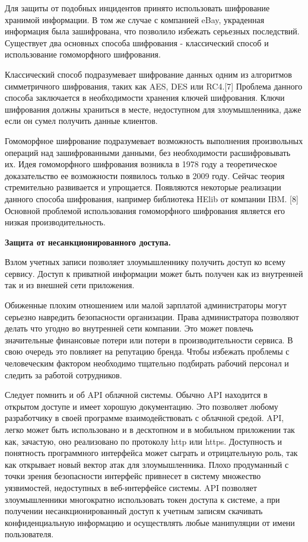 Для защиты от подобных инцидентов принято использовать шифрование хранимой информации. В том же случае с компанией eBay, украденная информация была зашифрована, что позволило избежать серьезных последствий. Существует два основных способа шифрования - классический способ и использование гомоморфного шифрования. 

Классический способ подразумевает шифрование данных одним из алгоритмов симметричного шифрования, таких как AES, DES или RC4.[7] Проблема данного способа заключается в необходимости хранения ключей шифрования. Ключи шифрования должны храниться в месте, недоступном для злоумышленника, даже если он сумел получить данные клиентов.

Гомоморфное шифрование подразумевает возможность выполнения произвольных операций над зашифрованными данными, без необходимости расшифровывать их. Идея гомоморфного шифрования возникла в 1978 году а теоретическое доказательство ее возможности появилось только в 2009 году. Сейчас теория стремительно развивается и упрощается. Появляются некоторые реализации данного способа шифрования, например библиотека HElib от компании IBM. [8] Основной проблемой использования гомоморфного шифрования является его низкая производительность.

\textbf{Защита от несанкционированного доступа.}

Взлом учетных записи позволяет злоумышленнику получить доступ ко всему сервису. Доступ к приватной информации может быть получен как из внутренней так и из внешней сети приложения. 

Обиженные плохим отношением или малой зарплатой администраторы могут серьезно навредить безопасности организации. Права администратора позволяют делать что угодно во внутренней сети компании. Это может повлечь значительные финансовые потери или потери в производительности сервиса. В свою очередь это повлияет на репутацию бренда. Чтобы избежать проблемы с человеческим фактором необходимо тщательно подбирать рабочий персонал и следить за работой сотрудников.

Следует помнить и об API облачной системы. Обычно API находится в открытом доступе и имеет хорошую документацию. Это позволяет любому разработчику в своей программе взаимодействовать с облачной средой. API, легко может быть использовано и в десктопном и в мобильном приложении так как, зачастую, оно реализовано по протоколу http или https. Доступность и понятность программного интерфейса может сыграть и отрицательную роль, так как открывает новый вектор атак для злоумышленника. Плохо продуманный с точки зрения безопасности интерфейс привнесет в систему множество уязвимостей, недоступных в веб-интерфейсе системы. API позволяет злоумышленники многократно использовать токен доступа к системе, а при получении несанкционированный доступ к учетным записям скачивать конфиденциальную информацию и осуществлять любые манипуляции от имени пользователя.

